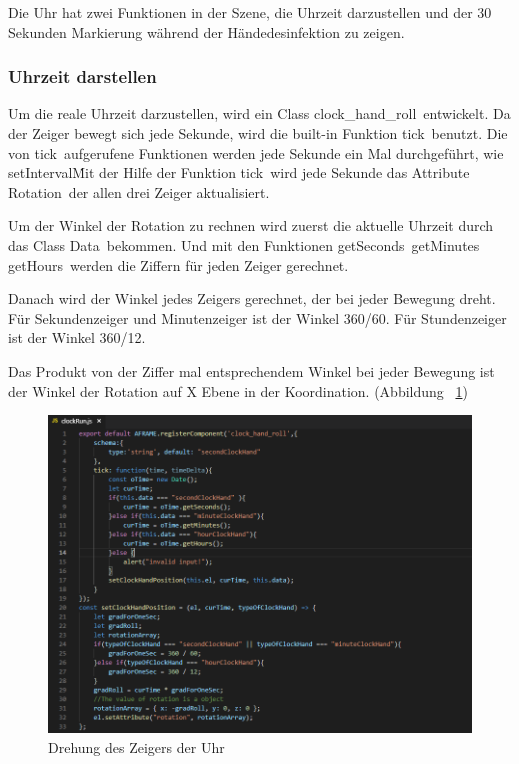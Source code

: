  Die Uhr hat zwei Funktionen in der Szene, die Uhrzeit darzustellen und der 30 Sekunden Markierung während der Händedesinfektion zu zeigen.
 
 \subsubsection{Uhrzeit darstellen}
 Um die reale Uhrzeit darzustellen, wird ein Class \glqq clock\_hand\_roll\grqq\ entwickelt. Da der Zeiger bewegt sich jede Sekunde, wird die built-in Funktion \glqq tick\grqq\ benutzt. Die von \glqq tick\grqq\ aufgerufene Funktionen werden jede Sekunde ein Mal durchgeführt, wie \glqq setInterval\grqq\.
 
 Mit der Hilfe der Funktion \glqq tick\grqq\ wird jede Sekunde das Attribute \glqq Rotation\grqq\ der allen drei Zeiger aktualisiert. 
 
 Um der Winkel der Rotation zu rechnen wird zuerst die aktuelle Uhrzeit durch das Class \glqq Data\grqq\ bekommen. Und mit den Funktionen \glqq getSeconds\grqq\, \glqq getMinutes\grqq\, \glqq getHours\grqq\ werden die Ziffern für jeden Zeiger gerechnet.
 
 Danach wird der Winkel jedes Zeigers gerechnet, der bei jeder Bewegung dreht. Für Sekundenzeiger und Minutenzeiger ist der Winkel 360/60. Für Stundenzeiger ist der Winkel 360/12.
 
 Das Produkt von der Ziffer mal entsprechendem Winkel bei jeder Bewegung ist der Winkel der Rotation auf X Ebene in der Koordination. (Abbildung ~\ref{fig:clockRoll})
 
\begin{figure}[ht]
\vspace*{0.2cm}
\centering
\includegraphics[width=\textwidth]{images/clockRoll.png}
\caption[Drehung des Zeigers der Uhr]{Drehung des Zeigers der Uhr}
\label{fig:clockRoll} 
\end{figure}
 
